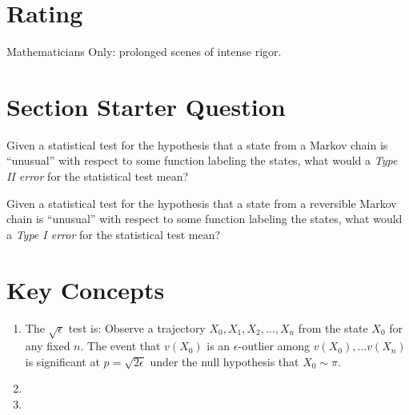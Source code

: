 \documentclass[12pt]{article}
\begin{document}
\myheader \mytitle

\hr


\hr

\usefirefox

\hr



\section*{Rating} %
Mathematicians Only:  prolonged scenes of intense rigor.

\hr

\section*{Section Starter Question}

Given a statistical test for the hypothesis that a state from a
Markov chain is ``unusual'' with respect to some function
labeling the states, what would a \emph{Type II error} for the statistical
test mean?  

Given a statistical test for the hypothesis that a state from a
reversible Markov chain is ``unusual'' with respect to some function
labeling the states, what would a \emph{Type I error} for the statistical
test mean?

\hr

\section*{Key Concepts}

\begin{enumerate}
    \item
        The \( \sqrt{\epsilon} \) test is:  Observe a trajectory \( X_0,
        X_1, X_2, \dots, X_n \) from the state \( X_0 \) for any fixed \(
        n \). The event that \( v(X_0) \) is an \( \epsilon \)-outlier
        among \( v(X_0), \dots v(X_n ) \) is significant at \( p = \sqrt
        {2\epsilon} \) under the null hypothesis that \( X_0 \sim \pi \).
    \item
    \item
\end{enumerate}
\end{document}
